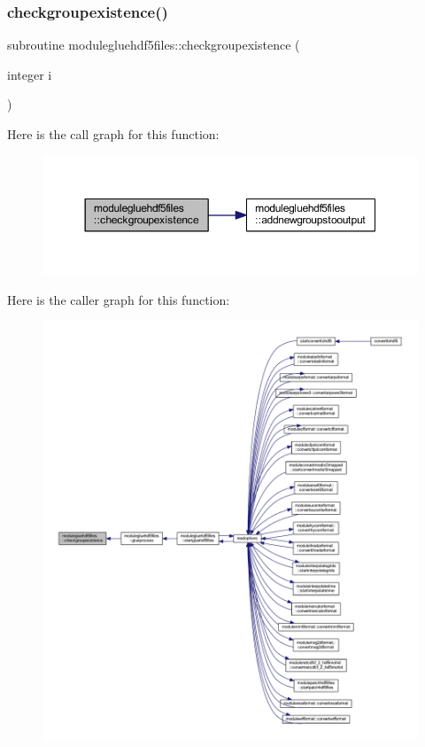 \subsubsection{\texorpdfstring{checkgroupexistence()}{checkgroupexistence()}}
{\footnotesize\ttfamily subroutine modulegluehdf5files\+::checkgroupexistence (\begin{DoxyParamCaption}\item[{integer}]{i }\end{DoxyParamCaption})\hspace{0.3cm}{\ttfamily [private]}}

Here is the call graph for this function\+:\nopagebreak
\begin{figure}[H]
\begin{center}
\leavevmode
\includegraphics[width=350pt]{namespacemodulegluehdf5files_a725536a9cfa2982b35ce20a2bd143ad8_cgraph}
\end{center}
\end{figure}
Here is the caller graph for this function\+:\nopagebreak
\begin{figure}[H]
\begin{center}
\leavevmode
\includegraphics[width=350pt]{namespacemodulegluehdf5files_a725536a9cfa2982b35ce20a2bd143ad8_icgraph}
\end{center}
\end{figure}
